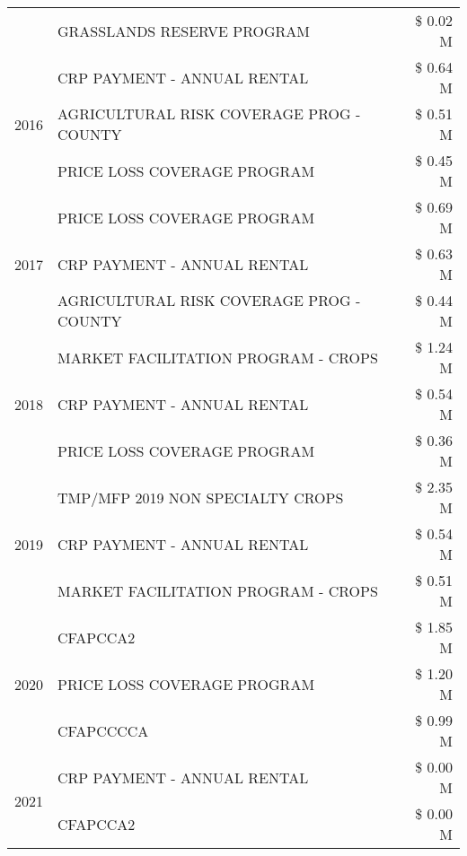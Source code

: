 \begin{tabular}{llr}
 & GRASSLANDS RESERVE PROGRAM & \$ 0.02 M \\
\cline{1-3}
\multirow[t]{3}{*}{2016} & CRP PAYMENT - ANNUAL RENTAL & \$ 0.64 M \\
 & AGRICULTURAL RISK COVERAGE PROG - COUNTY & \$ 0.51 M \\
 & PRICE LOSS COVERAGE PROGRAM & \$ 0.45 M \\
\cline{1-3}
\multirow[t]{3}{*}{2017} & PRICE LOSS COVERAGE PROGRAM & \$ 0.69 M \\
 & CRP PAYMENT - ANNUAL RENTAL & \$ 0.63 M \\
 & AGRICULTURAL RISK COVERAGE PROG - COUNTY & \$ 0.44 M \\
\cline{1-3}
\multirow[t]{3}{*}{2018} & MARKET FACILITATION PROGRAM - CROPS & \$ 1.24 M \\
 & CRP PAYMENT - ANNUAL RENTAL & \$ 0.54 M \\
 & PRICE LOSS COVERAGE PROGRAM & \$ 0.36 M \\
\cline{1-3}
\multirow[t]{3}{*}{2019} & TMP/MFP 2019 NON SPECIALTY CROPS & \$ 2.35 M \\
 & CRP PAYMENT - ANNUAL RENTAL & \$ 0.54 M \\
 & MARKET FACILITATION PROGRAM - CROPS & \$ 0.51 M \\
\cline{1-3}
\multirow[t]{3}{*}{2020} & CFAPCCA2 & \$ 1.85 M \\
 & PRICE LOSS COVERAGE PROGRAM & \$ 1.20 M \\
 & CFAPCCCCA & \$ 0.99 M \\
\cline{1-3}
\multirow[t]{2}{*}{2021} & CRP PAYMENT - ANNUAL RENTAL & \$ 0.00 M \\
 & CFAPCCA2 & \$ 0.00 M \\
\cline{1-3}
\bottomrule
\end{tabular}
